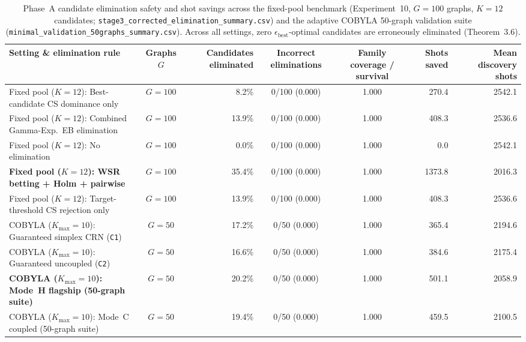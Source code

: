 \begin{table}[htbp]
\caption{Phase~A candidate elimination safety and shot savings across the fixed-pool benchmark (Experiment~10, $G=100$ graphs, $K=12$ candidates; \texttt{stage3\_corrected\_elimination\_summary.csv}) and the adaptive COBYLA 50-graph validation suite (\texttt{minimal\_validation\_50graphs\_summary.csv}). Across all settings, zero $\epsilon_{\mathrm{best}}$-optimal candidates are erroneously eliminated (Theorem~3.6).}
\label{tab:elimination_safety}
\centering
\footnotesize
\begin{tabular}{@{}l c r c c r r@{}}
\toprule
Setting \& elimination rule & Graphs $G$ & Candidates eliminated & Incorrect eliminations & Family coverage / survival & Shots saved & Mean discovery shots \\
\midrule
Fixed pool ($K=12$): Best-candidate CS dominance only & $G=100$ & 8.2\% & 0/100 (0.000) & 1.000 & 270.4 & 2542.1 \\
Fixed pool ($K=12$): Combined Gamma-Exp.\ EB elimination & $G=100$ & 13.9\% & 0/100 (0.000) & 1.000 & 408.3 & 2536.6 \\
Fixed pool ($K=12$): No elimination & $G=100$ & 0.0\% & 0/100 (0.000) & 1.000 & 0.0 & 2542.1 \\
\textbf{Fixed pool ($K=12$): WSR betting + Holm + pairwise} & $G=100$ & 35.4\% & 0/100 (0.000) & 1.000 & 1373.8 & 2016.3 \\
Fixed pool ($K=12$): Target-threshold CS rejection only & $G=100$ & 13.9\% & 0/100 (0.000) & 1.000 & 408.3 & 2536.6 \\
COBYLA ($K_{\max}=10$): Guaranteed simplex CRN (\texttt{C1}) & $G=50$ & 17.2\% & 0/50 (0.000) & 1.000 & 365.4 & 2194.6 \\
COBYLA ($K_{\max}=10$): Guaranteed uncoupled (\texttt{C2}) & $G=50$ & 16.6\% & 0/50 (0.000) & 1.000 & 384.6 & 2175.4 \\
\textbf{COBYLA ($K_{\max}=10$): Mode~H flagship (50-graph suite)} & $G=50$ & 20.2\% & 0/50 (0.000) & 1.000 & 501.1 & 2058.9 \\
COBYLA ($K_{\max}=10$): Mode~C coupled (50-graph suite) & $G=50$ & 19.4\% & 0/50 (0.000) & 1.000 & 459.5 & 2100.5 \\
\bottomrule
\end{tabular}
\end{table}
